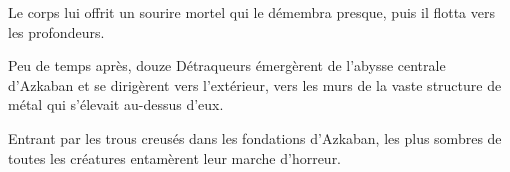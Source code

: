 Le corps lui offrit un sourire mortel qui le démembra presque, puis il flotta vers les profondeurs.

Peu de temps après, douze Détraqueurs émergèrent de l'abysse centrale d'Azkaban et se dirigèrent vers l'extérieur, vers les murs de la vaste structure de métal qui s'élevait au-dessus d'eux.

Entrant par les trous creusés dans les fondations d'Azkaban, les plus sombres de toutes les créatures entamèrent leur marche d'horreur.

